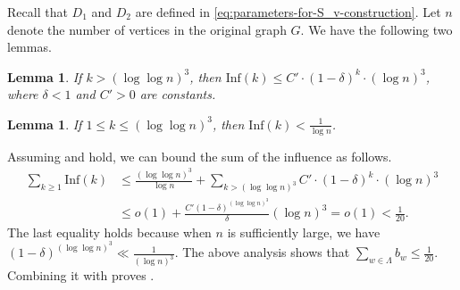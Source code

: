 \documentclass[11pt]{amsart}
\newtheorem{lemma}[theorem]{Lemma}
\theoremstyle{definition}
\theoremstyle{remark}
\begin{document}
Recall that $D_1$ and $D_2$ are defined in \eqref{eq:parameters-for-S_v-construction}. Let $n$ denote the number of vertices in the original graph $G$.
We have the following two lemmas. 

\begin{lemma}\label{lemma:influence-bound-level-1}
If $k > (\log \log n)^3$, then $\text{Inf}(k)  \leq C' \cdot (1-\delta)^{k} \cdot (\log n)^3$, where $\delta < 1$ and $C'  > 0$ are constants.
\end{lemma}

\begin{lemma}\label{lemma:influence-bound-level-2}
If $1 \leq k \leq (\log \log n)^3$, then $\text{Inf}(k) < \frac{1}{\log n}$.
\end{lemma}

Assuming  and  hold, we can bound the sum of the influence as follows.
\begin{align*}
\sum_{k \geq 1} \text{Inf}(k) &\leq  \frac{(\log \log n)^3}{\log n} + \sum_{k > (\log \log n)^3} C' \cdot (1-\delta)^{k} \cdot (\log n)^3\\
&\leq o(1) + \frac{C' (1-\delta)^{(\log \log n)^3}}{\delta} (\log n)^3 = o(1) < \frac{1}{20}.
\end{align*}
The last equality holds because when $n$ is sufficiently large, we have $(1-\delta)^{(\log \log n)^3} \ll \frac{1}{(\log n)^3}$. 
The above analysis shows that $\sum_{w\in \Lambda} b_w \leq \frac{1}{20}$.
Combining it with  proves .
\end{document}
